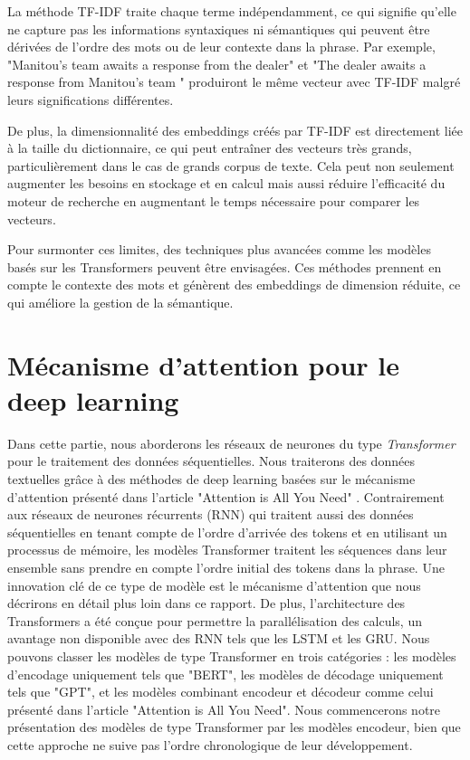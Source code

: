 \documentclass[12pt]{article}
\theoremstyle{definition}
\begin{document}
La méthode TF-IDF traite chaque terme indépendamment, ce qui signifie qu'elle ne capture pas les informations syntaxiques ni sémantiques qui peuvent être dérivées de l'ordre des mots ou de leur contexte dans la phrase. Par exemple, "Manitou's team awaits a response from the dealer" et "The dealer awaits a response from Manitou's team " produiront le même vecteur avec TF-IDF malgré leurs significations différentes. 

De plus, la dimensionnalité des embeddings créés par TF-IDF est directement liée à la taille du dictionnaire, ce qui peut entraîner des vecteurs très grands, particulièrement dans le cas de grands corpus de texte. Cela peut non seulement augmenter les besoins en stockage et en calcul mais aussi réduire l'efficacité du moteur de recherche en augmentant le temps nécessaire pour comparer les vecteurs.

Pour surmonter ces limites, des techniques plus avancées comme les modèles basés sur les Transformers peuvent être envisagées. Ces méthodes prennent en compte le contexte des mots et génèrent des embeddings de dimension réduite, ce qui améliore la gestion de la sémantique.

\section{Mécanisme d'attention pour le deep learning}

Dans cette partie, nous aborderons les réseaux de neurones du type \emph{Transformer} pour le traitement des données séquentielles. Nous traiterons des données textuelles grâce à des méthodes de deep learning basées sur le mécanisme d'attention présenté dans l'article "Attention is All You Need" \cite{a_i_a_y_n}. Contrairement aux réseaux de neurones récurrents (RNN) qui traitent aussi des données séquentielles en tenant compte de l'ordre d'arrivée des tokens et en utilisant un processus de mémoire, les modèles Transformer traitent les séquences dans leur ensemble sans prendre en compte l'ordre initial des tokens dans la phrase. Une innovation clé de ce type de modèle est le mécanisme d'attention que nous décrirons en détail plus loin dans ce rapport. De plus, l'architecture des Transformers a été conçue pour permettre la parallélisation des calculs, un avantage non disponible avec des RNN tels que les LSTM et les GRU. Nous pouvons classer les modèles de type Transformer en trois catégories : les modèles d'encodage uniquement tels que "BERT", les modèles de décodage uniquement tels que "GPT", et les modèles combinant encodeur et décodeur comme celui présenté dans l'article "Attention is All You Need". Nous commencerons notre présentation des modèles de type Transformer par les modèles encodeur, bien que cette approche ne suive pas l'ordre chronologique de leur développement.
\end{document}
